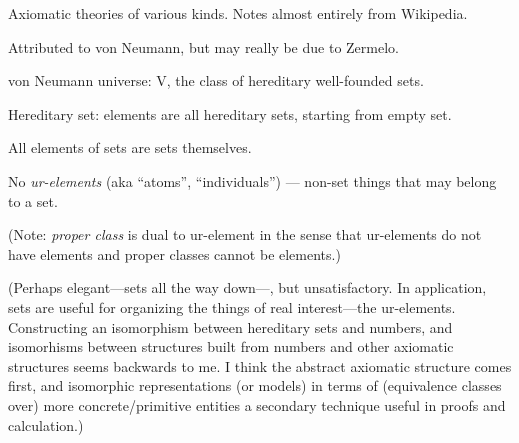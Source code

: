 % 


\setcounter{currentlevel}{\value{baseSectionLevel}}


Axiomatic theories of various kinds.
Notes almost entirely from 
Wikipedia\cite{wiki:Set_theory,iep:Set_theory,eom:Set_theory,sep:Set_theory}.

\label{sec:von_Neumann_universe}

Attributed to von Neumann, but may really be due to
Zermelo\cite{Zermelo:1930:ZERBGU}.

von Neumann universe: \textsf{V}\cite{wiki:Von_Neumann_universe},
the class of hereditary well-founded sets.

Hereditary set: elements are all hereditary sets, 
starting from empty set\cite{wiki:Hereditary-set}.

All elements of sets are sets themselves.

No \textsl{ur-elements}\cite{wiki:Urelement} 
(aka ``atoms'', ``individuals'') ---
non-set things that may belong to a set.

(Note: \textsl{proper class} is dual to ur-element in the sense that
ur-elements do not have elements and proper classes cannot be 
elements.)

(Perhaps elegant---sets all the way down---, but unsatisfactory. 
In application, sets are useful for organizing the things
of real interest---the ur-elements.
Constructing an isomorphism between hereditary sets
and numbers, and isomorhisms between structures built
from numbers and other axiomatic structures seems
backwards to me.
I think the abstract axiomatic structure comes first, 
and isomorphic representations (or models) in terms of 
(equivalence classes over) more concrete/primitive
entities a secondary technique useful in proofs and calculation.)


